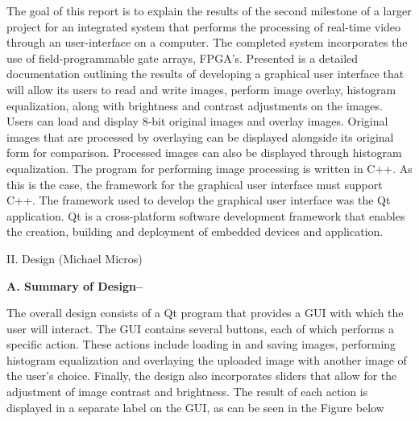 \documentclass{article}
\begin{document}
\begin{multicols*}{2}
 The goal of this report is to explain the results of the second milestone of a larger project for an integrated system that performs the processing of real-time video through an user-interface on a computer. The completed system incorporates the use of field-programmable gate arrays, FPGA’s.
     Presented is a detailed documentation outlining the results of developing a graphical user interface that will allow its users to read and write images, perform image overlay, histogram equalization, along with brightness and contrast adjustments on the images. Users can load and display 8-bit original images and overlay images. Original images that are processed by overlaying can be displayed alongside its original form for comparison. Processed images can also be displayed through histogram equalization.
     The program for performing image processing is written in C++. As this is the case, the framework for the graphical user interface must support C++.  The framework used to develop the graphical user interface was the Qt application. Qt is a cross-platform software development framework that enables the creation, building and deployment of embedded devices and application.





\begin{center}
{\large II. Design (Michael Micros)}
\end{center}

{\bf A. Summary of Design--}  

The overall design consists of a Qt program that provides a GUI with which the user will interact. The GUI contains several buttons, each of which performs a specific action. These actions include loading in and saving images, performing histogram equalization and overlaying the uploaded image with another image of the user's choice. Finally, the design also incorporates sliders that allow for the adjustment of image contrast and brightness. The result of each action is displayed in a separate label on the GUI, as can be seen in the Figure below


\end{multicols*}
\end{document}
